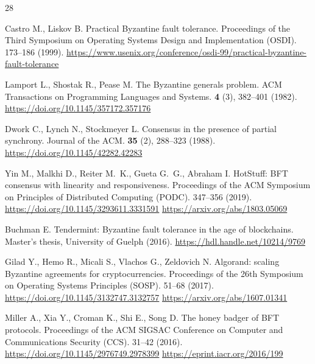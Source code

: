 
\begin{thebibliography}{28}

Castro M., Liskov B. Practical Byzantine fault tolerance. Proceedings of the
Third Symposium on Operating Systems Design and Implementation (OSDI). 173--186
(1999).
\url{https://www.usenix.org/conference/osdi-99/practical-byzantine-fault-tolerance}

Lamport L., Shostak R., Pease M. The Byzantine generals problem. ACM
Transactions on Programming Languages and Systems. \textbf{4} (3), 382--401
(1982).
\url{https://doi.org/10.1145/357172.357176}

Dwork C., Lynch N., Stockmeyer L. Consensus in the presence of partial
synchrony. Journal of the ACM. \textbf{35} (2), 288--323 (1988).
\url{https://doi.org/10.1145/42282.42283}

Yin M., Malkhi D., Reiter M.~K., Gueta G.~G., Abraham I. HotStuff: BFT consensus
with linearity and responsiveness. Proceedings of the ACM Symposium on
Principles of Distributed Computing (PODC). 347--356 (2019).
\url{https://doi.org/10.1145/3293611.3331591}
\url{https://arxiv.org/abs/1803.05069}

Buchman E. Tendermint: Byzantine fault tolerance in the age of blockchains.
Master's thesis, University of Guelph (2016).
\url{https://hdl.handle.net/10214/9769}

Gilad Y., Hemo R., Micali S., Vlachos G., Zeldovich N. Algorand: scaling
Byzantine agreements for cryptocurrencies. Proceedings of the 26th Symposium on
Operating Systems Principles (SOSP). 51--68 (2017).
\url{https://doi.org/10.1145/3132747.3132757}
\url{https://arxiv.org/abs/1607.01341}

Miller A., Xia Y., Croman K., Shi E., Song D. The honey badger of BFT protocols.
Proceedings of the ACM SIGSAC Conference on Computer and Communications Security
(CCS). 31--42 (2016).
\url{https://doi.org/10.1145/2976749.2978399}
\url{https://eprint.iacr.org/2016/199}


\end{thebibliography}
